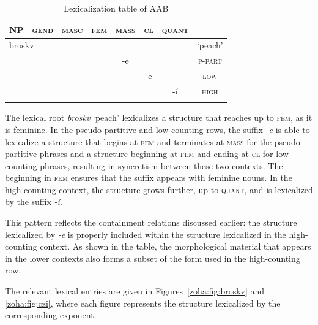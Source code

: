 \documentclass[output=paper,colorlinks,citecolor=brown
]{langscibook}
\begin{document}
\begin{table}
\begin{tabularx}{0.75\textwidth}{cccccccc}
\lsptoprule
\textsc{NP}&{\textsc{gend}} & {\textsc{masc}} & {\textsc{fem}} & {\textsc{mass}} & {\textsc{cl}} & {\textsc{quant}}\\
\midrule
\multicolumn{2}{l}{\cellcolor[gray]{0.9}broskv} & {\cellcolor[gray]{0.9}} & {\cellcolor[gray]{0.9}}  & {} & {} & {} & {`peach'}\\[.5ex]
\cellcolor[gray]{0.9} & {\cellcolor[gray]{0.9}} & {\cellcolor[gray]{0.9}} & {\cellcolor[gray]{0.8}} & {\cellcolor[gray]{0.8}-e} & {} & {} & {\textsc{p-part}}\\[.5ex]
\cellcolor[gray]{0.9} & {\cellcolor[gray]{0.9}} & {\cellcolor[gray]{0.9}} & {\cellcolor[gray]{0.8}} & {\cellcolor[gray]{0.8}} & {\cellcolor[gray]{0.8}-e} & {} & {\textsc{low}} \\[.5ex]
\cellcolor[gray]{0.9} & {\cellcolor[gray]{0.9}} & {\cellcolor[gray]{0.9}} & {\cellcolor[gray]{0.7}} & {\cellcolor[gray]{0.7}} & {\cellcolor[gray]{0.7}} & {\cellcolor[gray]{0.7}-í} & {\textsc{high}} \\[.5ex]
\lspbottomrule
\end{tabularx}
\caption{Lexicalization table of AAB}
\label{zoha:tab:lexAAB}
\end{table}

\noindent The lexical root \textit{broskv} ‘peach’ lexicalizes a structure that reaches up to \textsc{fem}, as it is feminine. In the pseudo-partitive and low-counting rows, the suffix \textit{-e} is able to lexicalize a structure that begins at \textsc{fem} and terminates at \textsc{mass} for the pseudo-partitive phrases and a structure beginning at \textsc{fem} and ending at \textsc{cl} for low-counting phrases, resulting in syncretism between these two contexts. The beginning in \textsc{fem} ensures that the suffix appears with feminine nouns. In the high-counting context, the structure grows further, up to \textsc{quant}, and is lexicalized by the suffix \textit{-í}.

This pattern reflects the containment relations discussed earlier: the structure lexicalized by \textit{-e} is properly included within the structure lexicalized in the high-counting context. As shown in the table, the morphological material that appears in the lower contexts also forms a subset of the form used in the high-counting row.

The relevant lexical entries are given in Figures~\ref{zoha:fig:broskv} and \ref{zoha:fig:czi}, where each figure represents the structure lexicalized by the corresponding exponent.
\end{document}
